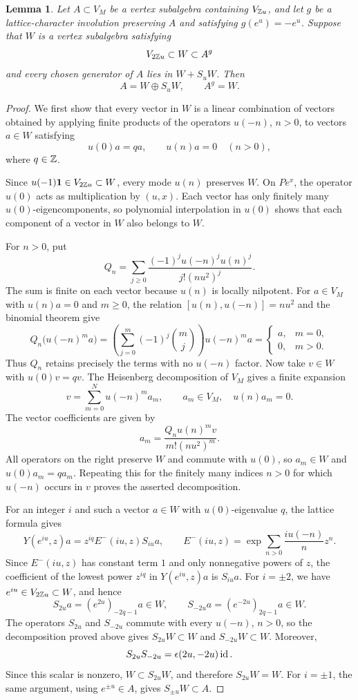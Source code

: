 \documentclass[11pt,reqno]{amsart}
\newtheorem{lemma}[theorem]{Lemma}
\theoremstyle{definition}\newtheorem{definition}[theorem]{Definition}
\theoremstyle{remark}\newtheorem{remark}[theorem]{Remark}
\newcommand{\one}{\mathbf1}\newcommand{\slc}{\mathfrak{sl}_2}
\numberwithin{equation}{section}
\begin{document}
\begin{lemma}\label{lem:shift}
Let $A\subset V_M$ be a vertex subalgebra containing $V_{\mathbb Z u}$, and let $g$ be a lattice-character involution preserving $A$ and satisfying $g(e^u)=-e^u$. Suppose that $W$ is a vertex subalgebra satisfying
\[
 V_{2\mathbb Z u}\subset W\subset A^g
\]
and every chosen generator of $A$ lies in $W+S_uW$. Then
\[
 A=W\oplus S_uW,\qquad A^g=W.
\]
\end{lemma}
\begin{proof}
\leavevmode
\begingroup
We first show that every vector in $W$ is a linear combination of vectors obtained by applying finite products of the operators $u(-n)$, $n>0$, to vectors $a\in W$ satisfying
\[
 u(0)a=qa,\qquad u(n)a=0\quad(n>0),
\]
where $q\in\mathbb Z$.

Since $u(-1)\one\in V_{2\Z u}\subset W$, every mode $u(n)$ preserves $W$. On $Pe^x$, the operator $u(0)$ acts as multiplication by $(u,x)$. Each vector has only finitely many $u(0)$-eigencomponents, so polynomial interpolation in $u(0)$ shows that each component of a vector in $W$ also belongs to $W$.

For $n>0$, put
\[
 Q_n=\sum_{j\ge0}
       \frac{(-1)^j u(-n)^j u(n)^j}{j!(n u^2)^j}.
\]
The sum is finite on each vector because $u(n)$ is locally nilpotent. For $a\in V_M$ with $u(n)a=0$ and $m\ge0$, the relation $[u(n),u(-n)]=n u^2$ and the binomial theorem give
\[
 Q_n\bigl(u(-n)^m a\bigr)
 =\left(\sum_{j=0}^{m}(-1)^j\binom mj\right)u(-n)^m a
 =\begin{cases}
   a,&m=0,\\
   0,&m>0.
  \end{cases}
\]
Thus $Q_n$ retains precisely the terms with no $u(-n)$ factor. Now take $v\in W$ with $u(0)v=qv$. The Heisenberg decomposition of $V_M$ gives a finite expansion
\[
 v=\sum_{m=0}^{N}u(-n)^m a_m,\qquad a_m\in V_M,\quad u(n)a_m=0.
\]
The vector coefficients are given by
\[
 a_m=\frac{Q_nu(n)^m v}{m!(n u^2)^m}.
\]
All operators on the right preserve $W$ and commute with $u(0)$, so $a_m\in W$ and $u(0)a_m=qa_m$. Repeating this for the finitely many indices $n>0$ for which $u(-n)$ occurs in $v$ proves the asserted decomposition.
\par\endgroup

For an integer $i$ and such a vector $a\in W$ with $u(0)$-eigenvalue $q$, the lattice formula gives
\[
 Y(e^{iu},z)a=z^{iq}E^-(iu,z)S_{iu}a,
 \qquad E^-(iu,z)=\exp\!\sum_{n>0}\frac{iu(-n)}n z^n.
\]
\begingroup
Since $E^-(iu,z)$ has constant term $1$ and only nonnegative powers of $z$, the coefficient of the lowest power $z^{iq}$ in $Y(e^{iu},z)a$ is $S_{iu}a$. For $i=\pm2$, we have $e^{iu}\in V_{2\mathbb Z u}\subset W$, and hence
\[
 S_{2u}a=(e^{2u})_{-2q-1}a\in W,\qquad
 S_{-2u}a=(e^{-2u})_{2q-1}a\in W.
\]
The operators $S_{2u}$ and $S_{-2u}$ commute with every $u(-n)$, $n>0$, so the decomposition proved above gives $S_{2u}W\subset W$ and $S_{-2u}W\subset W$. Moreover,
\[
 S_{2u}S_{-2u}=\epsilon(2u,-2u)\operatorname{id}.
\]
Since this scalar is nonzero, $W\subset S_{2u}W$, and therefore $S_{2u}W=W$. For $i=\pm1$, the same argument, using $e^{\pm u}\in A$, gives $S_{\pm u}W\subset A$.
\par\endgroup


\end{proof}
\end{document}
